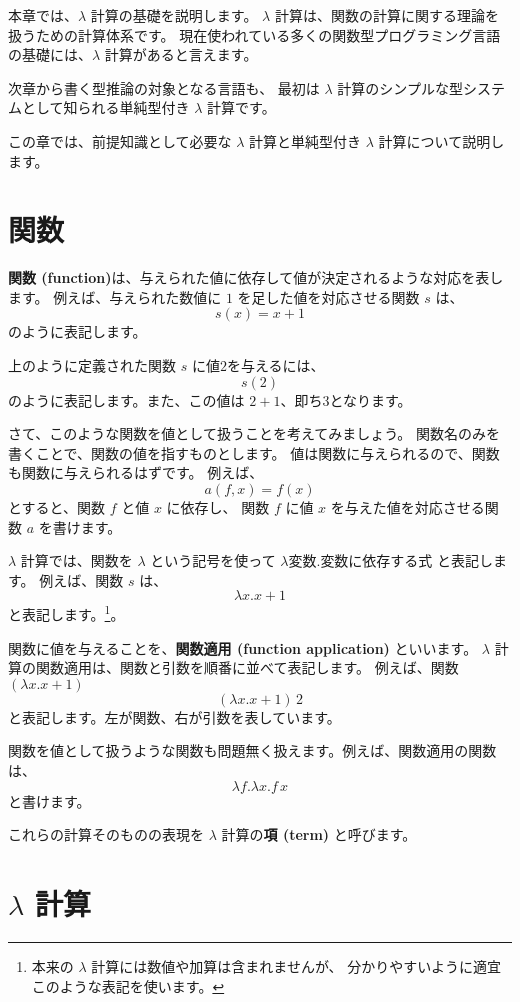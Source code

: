 
本章では、$\lambda$ 計算の基礎を説明します。
$\lambda$ 計算は、関数の計算に関する理論を扱うための計算体系です。
現在使われている多くの関数型プログラミング言語の基礎には、$\lambda$ 計算があると言えます。

次章から書く型推論の対象となる言語も、
最初は $\lambda$ 計算のシンプルな型システムとして知られる単純型付き $\lambda$ 計算です。

この章では、前提知識として必要な $\lambda$ 計算と単純型付き $\lambda$ 計算について説明します。

\section{関数}

\textbf{関数 (function)}は、与えられた値に依存して値が決定されるような対応を表します。
例えば、与えられた数値に $1$ を足した値を対応させる関数 $s$ は、
\[
  s(x) = x+1
\]
のように表記します。

上のように定義された関数 $s$ に値$2$を与えるには、
\[
  s(2)
\]
のように表記します。また、この値は $2+1$、即ち$3$となります。

さて、このような関数を値として扱うことを考えてみましょう。
関数名のみを書くことで、関数の値を指すものとします。
値は関数に与えられるので、関数も関数に与えられるはずです。
例えば、
\[
  a(f, x) = f(x)
\]
とすると、関数 $f$ と値 $x$ に依存し、
関数 $f$ に値 $x$ を与えた値を対応させる関数 $a$ を書けます。

$\lambda$ 計算では、関数を $\lambda$ という記号を使って
$\lambda \text{変数} . \text{変数に依存する式}$ と表記します。
例えば、関数 $s$ は、
\[
  \lambda x . x + 1
\]
と表記します。\footnote{本来の $\lambda$ 計算には数値や加算は含まれませんが、
分かりやすいように適宜このような表記を使います。}。

関数に値を与えることを、\textbf{関数適用 (function application)} といいます。
$\lambda$ 計算の関数適用は、関数と引数を順番に並べて表記します。
例えば、関数 $(\lambda x . x + 1)$ 
\[
  (\lambda x . x + 1) \, 2
\]
と表記します。左が関数、右が引数を表しています。

関数を値として扱うような関数も問題無く扱えます。例えば、関数適用の関数は、
\[
  \lambda f . \lambda x . f \, x
\]
と書けます。

これらの計算そのものの表現を $\lambda$ 計算の\textbf{項 (term)} と呼びます。

\section{$\lambda$ 計算}

